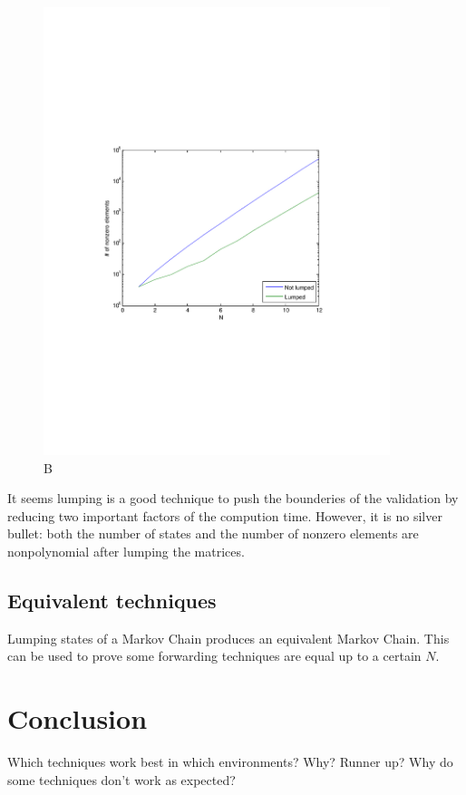\documentclass[10pt,a4paper]{article}
\begin{document}
\begin{figure}[h!tb]
\centering
\includegraphics[clip=true, trim=9em 24em 9em 24em, width=0.9\textwidth]{resources/plotlumpingnnz.pdf}
\caption{B}
\label{lumpnnz}
\end{figure}

It seems lumping is a good technique to push the bounderies of the validation by reducing two important factors of the compution time. However, it is no silver bullet: both the number of states and the number of nonzero elements are nonpolynomial after lumping the matrices.

\subsection{Equivalent techniques}
Lumping states of a Markov Chain produces an equivalent Markov Chain. This can be used to prove some forwarding techniques are equal up to a certain $N$.

\section{Conclusion}
\label{secconclusion}
Which techniques work best in which environments? Why? Runner up? Why do some techniques don't work as expected?
\end{document}
